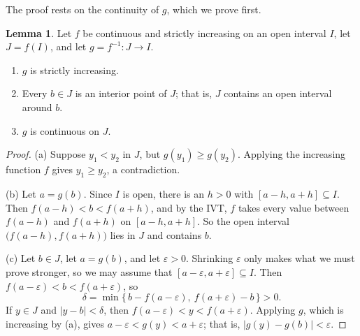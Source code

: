 \documentclass[12pt,letterpaper]{article}
\theoremstyle{definition}
\newtheorem{lemma}[theorem]{Lemma}
\begin{document}
The proof rests on the continuity of $g$, which we prove first.

\begin{lemma}\label{lem:inverse-continuous}
  Let $f$ be continuous and strictly increasing on an open interval $I$, let
  $J=f(I)$, and let $g=f^{-1}\colon J\to I$.
  \begin{enumerate}[label=(\alph*)]
    \item $g$ is strictly increasing.
    \item Every $b\in J$ is an interior point of $J$; that is, $J$ contains an
      open interval around $b$.
    \item $g$ is continuous on $J$.
  \end{enumerate}
\end{lemma}

\begin{proof}
  (a) Suppose $y_1<y_2$ in $J$, but $g(y_1)\geq g(y_2)$. Applying the
  increasing function $f$ gives $y_1\geq y_2$, a contradiction.

  (b) Let $a=g(b)$. Since $I$ is open, there is an $h>0$ with
  $[a-h,a+h]\subseteq I$. Then $f(a-h)<b<f(a+h)$, and by the IVT, $f$ takes
  every value between $f(a-h)$ and $f(a+h)$ on $[a-h,a+h]$. So the open
  interval $\bigl(f(a-h),f(a+h)\bigr)$ lies in $J$ and contains $b$.

  (c) Let $b\in J$, let $a=g(b)$, and let $\varepsilon>0$. Shrinking
  $\varepsilon$ only makes what we must prove stronger, so we may assume that
  $[a-\varepsilon,a+\varepsilon]\subseteq I$. Then
  $f(a-\varepsilon)<b<f(a+\varepsilon)$, so
  \[
    \delta=\min\bigl\{\,b-f(a-\varepsilon),\ f(a+\varepsilon)-b\,\bigr\}>0.
  \]
  If $y\in J$ and $|y-b|<\delta$, then $f(a-\varepsilon)<y<f(a+\varepsilon)$.
  Applying $g$, which is increasing by (a), gives
  $a-\varepsilon<g(y)<a+\varepsilon$; that is, $|g(y)-g(b)|<\varepsilon$.
\end{proof}
\end{document}
